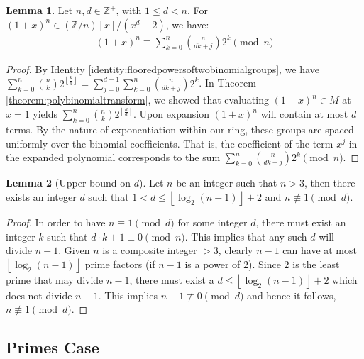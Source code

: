 \documentclass{article}
\theoremstyle{plain}
\theoremstyle{definition}
\newtheorem{lemma}{Lemma}
\newcommand{\floor}[1]{\left\lfloor #1 \right\rfloor}
\newcommand{\Z}{\mathbb{Z}}
\newcommand{\Zn}{\Z/n}
\begin{document}
\begin{lemma} \label{lemma:polytermcoeffs}
Let $n, d \in \Z^+$, with $1 \leq d < n$. For $(1 + x)^n \in (\Zn)[x]/(x^d-2)$, we have:
\begin{align}
    [x^j](1 + x)^n \equiv \sum_{k=0}^{n} \binom{n}{d k + j} 2^{k} \pmod{n}
\end{align}
\end{lemma}
\begin{proof}
By Identity \ref{identity:flooredpowersoftwobinomialgroups}, we have $\sum_{k=0}^{n} \binom{n}{k} 2^{\floor{\frac{k}{d}}} = \sum_{j=0}^{d-1} \sum_{k=0}^{n} \binom{n}{d k + j} 2^{k}$. In Theorem \ref{theorem:polybinomialtransform}, we showed that evaluating $(1+x)^n \in M$ at $x=1$ yields $\sum_{k=0}^{n} \binom{n}{k} 2^{\floor{\frac{k}{d}}}$. Upon expansion $(1+x)^n$ will contain at most $d$ terms. By the nature of exponentiation within our ring, these groups are spaced uniformly over the binomial coefficients. That is, the coefficient of the term $x^j$ in the expanded polynomial corresponds to the sum $\sum_{k=0}^{n} \binom{n}{d k + j} 2^{k} \pmod{n}$.
\end{proof}

\begin{lemma}[Upper bound on $d$] \label{lemma:leastd}
Let $n$ be an integer such that $n > 3$, then there exists an integer $d$ such that $1 < d \leq \floor{\log_2(n-1)} + 2$ and $n \not\equiv 1 \pmod{d}$.
\end{lemma}
\begin{proof}
In order to have $n \equiv 1 \pmod{d}$ for some integer $d$, there must exist an integer $k$ such that $d \cdot k + 1 \equiv 0 \pmod{n}$. This implies that any such $d$ will divide $n-1$. Given $n$ is a composite integer $> 3$, clearly $n-1$ can have at most $\floor{\log_2(n-1)}$ prime factors (if $n-1$ is a power of $2$). Since $2$ is the least prime that may divide $n-1$, there must exist a $d \leq \floor{\log_2(n-1)} + 2$ which does not divide $n-1$. This implies $n-1 \not\equiv 0 \pmod{d}$ and hence it follows, $n \not\equiv 1 \pmod{d}$.
\end{proof}

\subsection{Primes Case}
\end{document}
